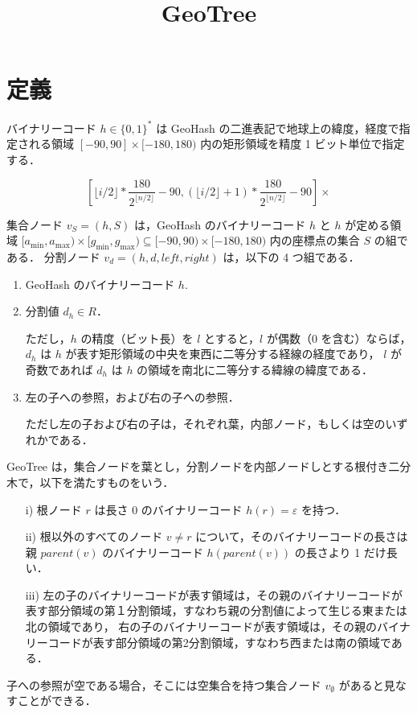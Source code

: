 \documentclass[11pt]{jsarticle}
\title{GeoTree}
\author{}
\date{}
\begin{document}
\maketitle

\section{定義}

バイナリーコード $h \in\{0,1\}^*$ は GeoHash の二進表記で地球上の緯度，経度で指定される領域 $[-90, 90] \times [-180, 180)$ 内の矩形領域を精度 1 ビット単位で指定する．

\[
\left[ {\lfloor{i/2}\rfloor}*\frac{180}{2^{\lfloor{n/2}\rfloor}} -90, ({\lfloor{i/2}\rfloor}+1)*\frac{180}{2^{\lfloor{n/2}\rfloor}} -90 \right]
\times 
\]

集合ノード $v_S=(h, S)$ は，GeoHash のバイナリーコード $h$ と $h$ が定める領域 $[a_\mathrm{min}, a_\mathrm{max}) \times [g_\mathrm{min}, g_\mathrm{max}) \subseteq [-90, 90) \times [-180, 180)$ 内の座標点の集合 $S$ の組である．
分割ノード $v_d = (h, d, \mathit{left}, \mathit{right})$ は，以下の 4 つ組である．
\begin{enumerate}
\item
GeoHash のバイナリーコード $h$. 
\item
分割値 $d_h \in R$．

ただし，$h$ の精度（ビット長）を $l$ とすると，$l$ が偶数（0 を含む）ならば，$d_h$ は
$h$ が表す矩形領域の中央を東西に二等分する経線の経度であり，
$l$ が奇数であれば $d_h$ は $h$ の領域を南北に二等分する緯線の緯度である．
\item
左の子への参照，および右の子への参照．

ただし左の子および右の子は，それぞれ葉，内部ノード，もしくは空のいずれかである．
\end{enumerate}

\begin{defn}[GeoTree]
GeoTree は，集合ノードを葉とし，分割ノードを内部ノードしとする根付き二分木で，以下を満たすものをいう．
\begin{itemize}
\item[i)]
根ノード $r$ は長さ $0$ のバイナリーコード $h(r) = \varepsilon$ を持つ．
\item[ii)]
根以外のすべてのノード $v \neq r$ について，そのバイナリーコードの長さは親 $\mathit{parent}(v)$ のバイナリーコード 
$h(\mathit{parent}(v))$ の長さより 1 だけ長い．
\item[iii)]
左の子のバイナリーコードが表す領域は，その親のバイナリーコードが表す部分領域の第１分割領域，すなわち親の分割値によって生じる東または北の領域であり，
右の子のバイナリーコードが表す領域は，その親のバイナリーコードが表す部分領域の第2分割領域，すなわち西または南の領域である．
\end{itemize}
\end{defn}

子への参照が空である場合，そこには空集合を持つ集合ノード $v_\emptyset$ があると見なすことができる．
\end{document}
